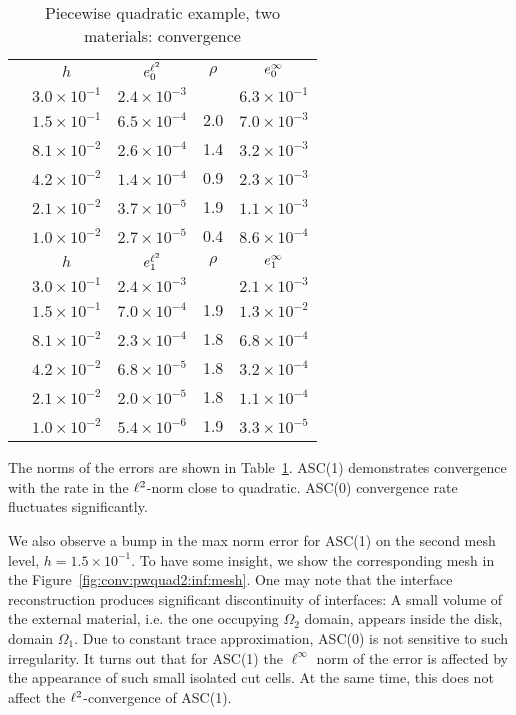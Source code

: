 	\begin{table}[h!]\small
		\centering
		\caption{Piecewise quadratic example, two materials: convergence \label{tab:conv:pwquad2}}
		\begin{tabular}[1.5]{| c | c || c | c || c |}
		  \hline
		  \multirow{7}{*}{\rotatebox{90}{ASC(0)}} & $h$ & $e^{{\ell^2}}_{0}$ & ${\rho}$ & $e^{\infty}_{0}$ \\
		  \cline{2-5}
		  & $3.0\times10^{-1}$ & $2.4\times10^{-3}$ & & $6.3\times10^{-1}$ \\
		  \cline{2-5}
		  & $1.5\times10^{-1}$ & $6.5\times10^{-4}$ & 2.0 & $7.0\times10^{-3}$ \\
		  \cline{2-5}
		  & $8.1\times10^{-2}$ & $2.6\times10^{-4}$ & 1.4 & $3.2\times10^{-3}$ \\
		  \cline{2-5}
		  & $4.2\times10^{-2}$ & $1.4\times10^{-4}$ & 0.9 & $2.3\times10^{-3}$ \\
		  \cline{2-5}
		  & $2.1\times10^{-2}$ & $3.7\times10^{-5}$ & 1.9 & $1.1\times10^{-3}$ \\
		  \cline{2-5}
		  & $1.0\times10^{-2}$ & $2.7\times10^{-5}$ & 0.4 & $8.6\times10^{-4}$ \\
		  \hline
		  \hline
		  \multirow{7}{*}{\rotatebox{90}{ASC(1)}} & $h$ & $e^{{\ell^2}}_{1}$ & ${\rho}$ & $e^{\infty}_{1}$ \\
		  \cline{2-5}
		  & $3.0\times10^{-1}$ & $2.4\times10^{-3}$ & & $2.1\times10^{-3}$ \\
		  \cline{2-5}
		  & {$1.5\times10^{-1}$} & $7.0\times10^{-4}$ & 1.9 & {$1.3\times10^{-2}$} \\
		  \cline{2-5}
		  & $8.1\times10^{-2}$ & $2.3\times10^{-4}$ & 1.8 & $6.8\times10^{-4}$ \\
		  \cline{2-5}
		  & $4.2\times10^{-2}$ & $6.8\times10^{-5}$ & 1.8 & $3.2\times10^{-4}$ \\
		  \cline{2-5}
		  & $2.1\times10^{-2}$ & $2.0\times10^{-5}$ & 1.8 & $1.1\times10^{-4}$ \\
		  \cline{2-5}
		  & $1.0\times10^{-2}$ & $5.4\times10^{-6}$ & 1.9 & $3.3\times10^{-5}$ \\
		  \hline
		\end{tabular}
	\end{table}

	The norms of the errors are shown in Table~\ref{tab:conv:pwquad2}.        	
 ASC(1) demonstrates  convergence with the  rate in the ${\ell^2}$-norm close to quadratic.  ASC(0) convergence rate  fluctuates significantly.

        We also observe a bump in the max norm error for ASC(1) on the second mesh level,
        $h = 1.5\times10^{-1}$. To have some insight, we show the corresponding mesh in the Figure~\ref{fig:conv:pwquad2:inf:mesh}.
        One may note that the interface reconstruction produces significant discontinuity of
        interfaces: A small volume of the external material, i.e. the one occupying $\Omega_2$ domain, appears
        inside the disk, domain $\Omega_1$. Due to constant trace approximation, ASC(0)
        is not sensitive to such  irregularity. It turns out that for  ASC(1) the $\ell^\infty$ norm of the error is affected by  the appearance of such small isolated cut cells. At the same time, this  %
        does not affect the ${\ell^2}$-convergence of ASC(1).

